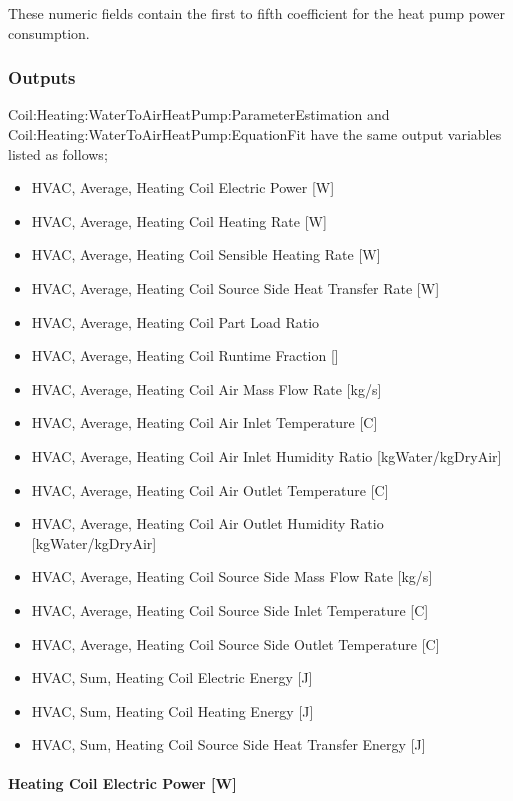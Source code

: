 These numeric fields contain the first to fifth coefficient for the heat pump power consumption.

\subsubsection{Outputs}\label{outputs-27}

Coil:Heating:WaterToAirHeatPump:ParameterEstimation and Coil:Heating:WaterToAirHeatPump:EquationFit have the same output variables listed as follows;

\begin{itemize}
\item
  HVAC, Average, Heating Coil Electric Power {[}W{]}
\item
  HVAC, Average, Heating Coil Heating Rate {[}W{]}
\item
  HVAC, Average, Heating Coil Sensible Heating Rate {[}W{]}
\item
  HVAC, Average, Heating Coil Source Side Heat Transfer Rate {[}W{]}
\item
  HVAC, Average, Heating Coil Part Load Ratio
\item
  HVAC, Average, Heating Coil Runtime Fraction {[]}
\item
  HVAC, Average, Heating Coil Air Mass Flow Rate {[}kg/s{]}
\item
  HVAC, Average, Heating Coil Air Inlet Temperature {[}C{]}
\item
  HVAC, Average, Heating Coil Air Inlet Humidity Ratio {[}kgWater/kgDryAir{]}
\item
  HVAC, Average, Heating Coil Air Outlet Temperature {[}C{]}
\item
  HVAC, Average, Heating Coil Air Outlet Humidity Ratio {[}kgWater/kgDryAir{]}
\item
  HVAC, Average, Heating Coil Source Side Mass Flow Rate {[}kg/s{]}
\item
  HVAC, Average, Heating Coil Source Side Inlet Temperature {[}C{]}
\item
  HVAC, Average, Heating Coil Source Side Outlet Temperature {[}C{]}
\item
  HVAC, Sum, Heating Coil Electric Energy {[}J{]}
\item
  HVAC, Sum, Heating Coil Heating Energy {[}J{]}
\item
  HVAC, Sum, Heating Coil Source Side Heat Transfer Energy {[}J{]}
\end{itemize}

\paragraph{Heating Coil Electric Power {[}W{]}}\label{heating-coil-electric-power-w-8}

